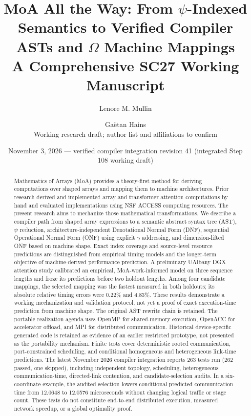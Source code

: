 \documentclass[11pt]{article}
\title{MoA All the Way: From $\psi$-Indexed Semantics to Verified Compiler ASTs and $\Omega$ Machine Mappings\\A Comprehensive SC27 Working Manuscript}
\author{Lenore M. Mullin \and Ga\"etan Hains\\\small Working research draft; author list and affiliations to confirm}
\date{November 3, 2026 --- verified compiler integration revision 41 (integrated Step 108 working draft)}
\begin{document}
\maketitle
\begin{abstract}
Mathematics of Arrays (MoA) provides a theory-first method for deriving computations over shaped arrays and mapping them to machine architectures. Prior research derived and implemented array and transformer attention computations by hand and evaluated implementations using NSF ACCESS computing resources. The present research aims to mechanize those mathematical transformations. We describe a compiler path from shaped array expressions to a semantic abstract syntax tree (AST), $\psi$ reduction, architecture-independent Denotational Normal Form (DNF), sequential Operational Normal Form (ONF) using explicit $\gamma$ addressing, and dimension-lifted ONF based on machine shape. Exact index coverage and source-level resource predictions are distinguished from empirical timing models and the longer-term objective of machine-derived performance prediction. A preliminary UAlbany DGX attention study calibrated an empirical, MoA-work-informed model on three sequence lengths and froze its predictions before two holdout lengths. Among four candidate mappings, the selected mapping was the fastest measured in both holdouts; its absolute relative timing errors were 0.22\% and 4.83\%. These results demonstrate a working mechanization and validation protocol, not yet a proof of exact execution-time prediction from machine shape. The original AST rewrite chain is retained. The portable realization agenda uses OpenMP for shared-memory execution, OpenACC for accelerator offload, and MPI for distributed communication. Historical device-specific generated code is retained as evidence of an earlier restricted prototype, not presented as the portability mechanism. Finite tests cover deterministic rooted communication, port-constrained scheduling, and conditional homogeneous and heterogeneous link-time predictions. The latest November 2026 compiler integration reports 263 tests run (262 passed, one skipped), including independent topology, scheduling, heterogeneous communication-time, directed-link contention, and candidate-selection audits. In a six-coordinate example, the audited selection lowers conditional predicted communication time from 12.0648 to 12.0576 microseconds without changing logical traffic or stage count. These tests do not constitute end-to-end distributed execution, measured network speedup, or a global optimality proof.
\end{abstract}
\end{document}
